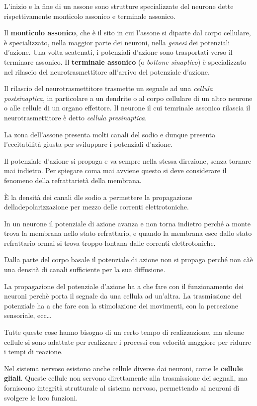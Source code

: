 \documentclass[]{article}
\begin{document}
L'inizio e la fine di un assone sono strutture specializzate del neurone
dette rispettivamente monticolo assonico e terminale assonico.

Il \textbf{monticolo assonico}, che è il sito in cui l'assone si diparte
dal corpo cellulare, è specializzato, nella maggior parte dei neuroni,
nella \emph{genesi} dei potenziali d'azione. Una volta scatenati, i
potenziali d'azione sono trasportati verso il terminare assonico. Il
\textbf{terminale assonico} (o \emph{bottone sinaptico}) è specializzato
nel rilascio del neurotrasmettitore all'arrivo del potenziale d'azione.

Il rilascio del neurotrasmettitore trasmette un segnale ad una
\emph{cellula postsinaptica}, in particolare a un dendrite o al corpo
cellulare di un altro neurone o alle cellule di un organo effettore. Il
neurone il cui temrinale assonico rilascia il neurotrasmettitore è detto
\emph{cellula presinaptica}.

La zona dell'assone presenta molti canali del sodio e dunque presenta
l'eccitabilità giusta per sviluppare i potenziali d'azione.

Il potenziale d'azione si propaga e va sempre nella stessa direzione,
senza tornare mai indietro. Per spiegare coma mai avviene questo si deve
considerare il fenomeno della refrattarietà della membrana.

È la densità dei canali dle sodio a permettere la propagazione
delladepolarizzazione per mezzo delle correnti elettrotoniche.

In un neurone il potenziale di azione avanza e non torna indietro perché
a monte trova la membrana nello stato refrattario, e quando la membrana
esce dallo stato refrattario ormai si trova troppo lontana dalle
correnti elettrotoniche.

Dalla parte del corpo basale il potenziale di azione non si propaga
perché non càè una densità di canali sufficiente per la sua diffusione.

La propagazione del potenziale d'azione ha a che fare con il
funzionamento dei neuroni perchè porta il segnale da una cellula ad
un'altra. La trasmissione del potenziale ha a che fare con la
stimolazione dei movimenti, con la percezione sensoriale, ecc\ldots{}

Tutte queste cose hanno bisogno di un certo tempo di realizzazione, ma
alcune cellule si sono adattate per realizzare i processi con velocità
maggiore per ridurre i tempi di reazione.

Nel sistema nervoso esistono anche cellule diverse dai neuroni, come le
\textbf{cellule gliali}. Queste cellule non servono direttamente alla
trasmissione dei segnali, ma forniscono integrità strutturale al sistema
nervoso, permettendo ai neuroni di svolgere le loro funzioni.
\end{document}
